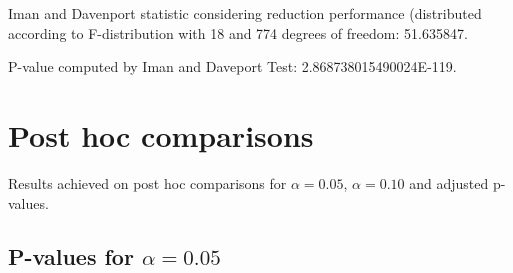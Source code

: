 \documentclass[a4paper,10pt]{article}
\begin{document}
\begin{landscape}
Iman and Davenport statistic considering reduction performance (distributed according to F-distribution with 18 and 774 degrees of freedom: 51.635847.

P-value computed by Iman and Daveport Test: 2.868738015490024E-119.\newline



\pagebreak

\section{Post hoc comparisons}

Results achieved on post hoc comparisons for $\alpha = 0.05$, $\alpha = 0.10$ and adjusted p-values.

\subsection{P-values for $\alpha=0.05$}


\end{landscape}
\end{document}
